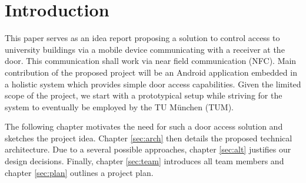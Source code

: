 \bigskip
\bigskip


\section{Introduction}

This paper serves as an idea report proposing a solution to control access to university buildings via a mobile device communicating with a receiver at the door. This communication shall work via near field communication (NFC). Main contribution of the proposed project will be an Android application embedded in a holistic system which provides simple door access capabilities. Given the limited scope of the project, we start with a prototypical setup while striving for the system to eventually be employed by the TU München (TUM).



The following chapter motivates the need for such a door access solution and sketches the project idea. Chapter \ref{sec:arch} then details the proposed technical architecture. Due to a several possible approaches, chapter \ref{sec:alt} justifies our design decisions. Finally, chapter \ref{sec:team} introduces all team members and chapter \ref{sec:plan} outlines a project plan.